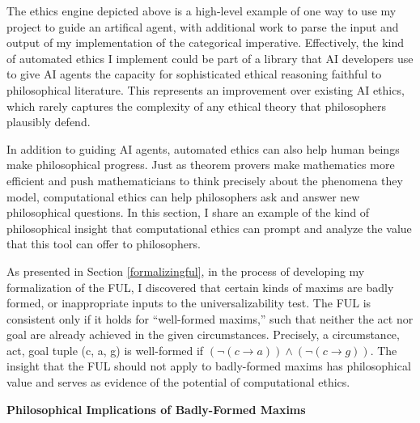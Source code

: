 \begin{isabellebody}
\begin{isamarkuptext}
The ethics engine depicted above is a high-level example of one way to use my project to guide an artifical agent,
with additional work to parse the input and output of my implementation of the categorical imperative.
Effectively, the kind of automated ethics I implement could be part of a library that AI developers use to 
give AI agents the capacity for sophisticated ethical reasoning faithful to philosophical literature. 
This represents an improvement over existing AI ethics, which rarely captures the complexity 
of any ethical theory that philosophers plausibly defend.%
\end{isamarkuptext}\isamarkuptrue%
%
\isadelimdocument
%
\endisadelimdocument
%
\isatagdocument
%
\isamarkuptrue%
%
\endisatagdocument
{\isafolddocument}%
%
\isadelimdocument
%
\endisadelimdocument
%
\begin{isamarkuptext}%
In addition to guiding AI agents, automated ethics can also help human beings make philosophical
progress. Just as theorem provers make mathematics more efficient and push mathematicians to think 
precisely about the phenomena they model, computational ethics can help philosophers ask and answer
new philosophical questions. In this section, I share an example of the kind of philosophical insight that computational ethics 
can prompt and analyze the value that this tool can offer to philosophers.%
\end{isamarkuptext}\isamarkuptrue%
%
\isadelimdocument
%
\endisadelimdocument
%
\isatagdocument
%
\isamarkuptrue%
%
\endisatagdocument
{\isafolddocument}%
%
\isadelimdocument
%
\endisadelimdocument
%
\begin{isamarkuptext}%
As presented in Section \ref{formalizingful}, in the process of developing my formalization of
the FUL, I discovered that certain kinds of maxims are badly formed, or inappropriate inputs to the 
universalizability test. The FUL is consistent only if it holds for ``well-formed maxims,''
such that neither the act nor goal are already achieved in the given circumstances. Precisely, 
a circumstance, act, goal tuple (c, a, g) is well-formed if $(\neg (c \longrightarrow a) ) \wedge 
(\neg(c \longrightarrow g))$. The insight that the FUL should not apply to badly-formed maxims has 
philosophical value and serves as evidence of the potential of computational ethics. 

\noindent \textbf{Philosophical Implications of Badly-Formed Maxims}


\end{isamarkuptext}
\end{isabellebody}
